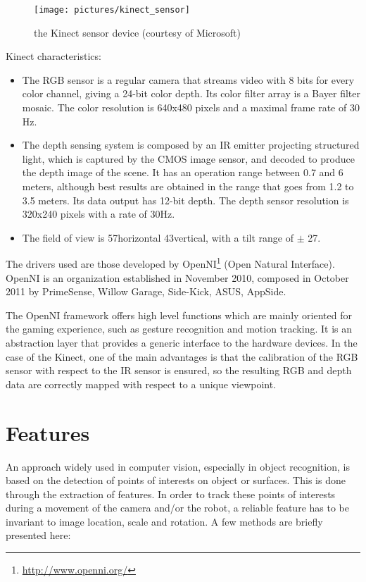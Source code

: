 \begin{figure}[h!]
\centering
\texttt{[image: pictures/kinect\_sensor]}
\caption{the Kinect sensor device (courtesy of Microsoft)}
\end{figure}

Kinect characteristics:
\begin{itemize}
\item The RGB sensor is a regular camera that streams video with 8 bits for every color channel, giving a 24-bit color depth. Its color filter array is a Bayer filter mosaic. The color resolution is 640x480 pixels and a maximal frame rate of 30 Hz.
\item The depth sensing system is composed by an IR emitter projecting structured light, which is captured by the CMOS image sensor, and decoded to produce the depth image of the scene. It has an operation range between 0.7 and 6 meters, although best results are obtained in the range that goes from 1.2 to 3.5 meters. Its data output has 12-bit depth. The depth sensor resolution is 320x240 pixels with a rate of 30Hz.
\item The field of view is 57\textdegree horizontal 43\textdegree vertical, with a tilt range of $\pm$ 27\textdegree.
\end{itemize}

The drivers used are those developed by OpenNI\footnote{\url{http://www.openni.org/}} (Open Natural Interface). OpenNI is an organization established in November 2010, composed in October 2011 by PrimeSense, Willow Garage, Side-Kick, ASUS, AppSide.

The OpenNI framework offers high level functions which are mainly oriented for the gaming experience, such as gesture recognition and motion tracking. It is an abstraction layer that provides a generic interface to the hardware devices. In the case of the Kinect, one of the main advantages is that the calibration of the RGB sensor with respect to the IR sensor is ensured, so the resulting RGB and depth data are correctly mapped with respect to a unique viewpoint.


\section{Features}

An approach widely used in computer vision, especially in object recognition, is based on the detection of points of interests on object or surfaces. This is done through the extraction of features. In order to track these points of interests during a movement of the camera and/or the robot, a reliable feature has to be invariant to image location, scale and rotation. A few methods are briefly presented here:

